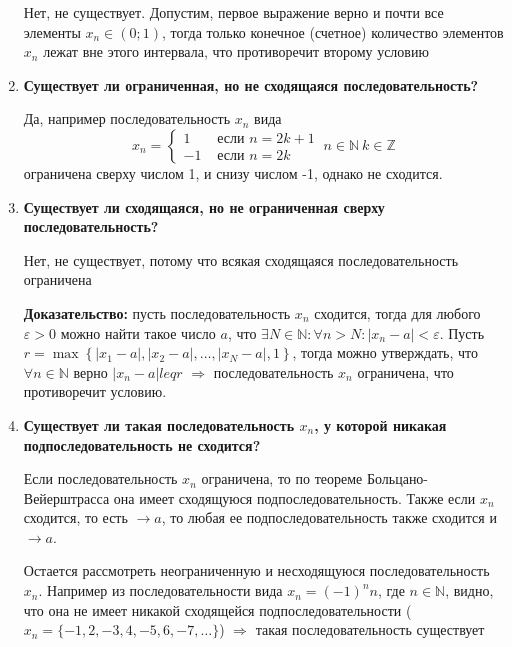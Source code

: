 \documentclass[a4paper,12pt]{article}
\begin{document}
\begin{enumerate}
{      Нет, не существует. Допустим, первое выражение верно и почти все элементы $x_n \in (0; 1)$,
      тогда только конечное (счетное) количество элементов $x_n$ лежат вне этого интервала, что
      противоречит второму условию  
    }
    \item {
      \textbf{Существует ли ограниченная, но не сходящаяся последовательность?}

      Да, например последовательность $x_n$ вида
      \begin{equation}
        x_n = \begin{cases}
          1 &\text{ если } n = 2k + 1 \\
          -1 &\text{ если } n = 2k
        \end{cases}\: n \in \mathbb{N} \: k \in \mathbb{Z}
      \end{equation}
      ограничена сверху числом 1, и снизу числом -1, однако не сходится.
    }
    \item {
      \textbf{Существует ли сходящаяся, но не ограниченная сверху последовательность?}

      Нет, не существует, потому что всякая сходящаяся последовательность ограничена

      \textbf{Доказательство:} пусть последовательность $x_n$ сходится, тогда для любого
      $\varepsilon > 0$ можно найти такое число $a$, что $\exists N \in \mathbb{N}: \forall n > N : |x_n - a| < \varepsilon$.
      Пусть $r = \max\left\{|x_1 - a|, |x_2 - a|, \dots, |x_N - a|, 1\right\}$, тогда
      можно утверждать, что $\forall n \in \mathbb{N}$ верно $|x_n - a| leq r$ $\Rightarrow$
      последовательность $x_n$ ограничена, что противоречит условию.
    }
    \item {
      \textbf{Существует ли такая последовательность  $x_n$, у которой никакая подпоследовательность не сходится?}
    
      Если последовательность $x_n$ ограничена, то по теореме Больцано-Вейерштрасса она имеет 
      сходящуюся подпоследовательность. Также если $x_n$ сходится, то есть $\rightarrow a$, то
      любая ее подпоследовательность также сходится и $\rightarrow a$.
      
      Остается рассмотреть неограниченную и несходящуюся последовательность $x_n$. Например из
      последовательности вида $x_n = (-1)^nn$, где $n \in \mathbb{N}$, видно, что она не имеет
      никакой сходящейся подпоследовательности ($x_n = \{-1, 2, -3, 4, -5, 6, -7, \dots\}$)
      $\Rightarrow$ такая последовательность существует

}
\end{enumerate}
\end{document}
